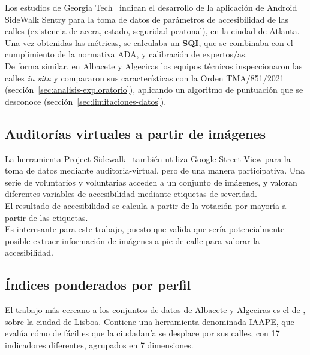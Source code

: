 Los estudios de Georgia Tech~\parencite{frackelton2013, guensler2015} indican el desarrollo de la aplicación de Android SideWalk Sentry para la toma de datos de parámetros de accesibilidad de las calles (existencia de acera, estado, seguridad peatonal), en la ciudad de Atlanta.
\\

Una vez obtenidas las métricas, se calculaba un \textbf{\gls{SQI}}, que se combinaba con el cumplimiento de la normativa ADA, y calibración de expertos/as.
\\

De forma similar, en Albacete y Algeciras los equipos técnicos inspeccionaron las calles \textit{in situ} y compararon sus características con la Orden TMA/851/2021 (sección~\ref{sec:analisis-exploratorio}), aplicando un algoritmo de puntuación que se desconoce (sección~\ref{sec:limitaciones-datos}).
\\

\subsection{Auditorías virtuales a partir de imágenes}
\label{subsec:eval-virtual}

La herramienta Project Sidewalk~\parencite{saha2019} también utiliza Google Street View para la toma de datos mediante \gls{auditoria-virtual}, pero de una manera participativa. Una serie de voluntarios y voluntarias acceden a un conjunto de imágenes, y valoran diferentes variables de accesibilidad mediante etiquetas de severidad.
\\

El resultado de accesibilidad se calcula a partir de la votación por mayoría a partir de las etiquetas.
\\

Es interesante para este trabajo, puesto que valida que sería potencialmente posible extraer información de imágenes a pie de calle para valorar la accesibilidad.
\\

\subsection{Índices ponderados por perfil}
\label{subsec:eval-ponderados}

El trabajo más cercano a los conjuntos de datos de Albacete y Algeciras es el de \textcite{moura2017}, sobre la ciudad de Lisboa. Contiene una herramienta denominada IAAPE, que evalúa cómo de fácil es que la ciudadanía se desplace por sus calles, con 17 indicadores diferentes, agrupados en 7 dimensiones.
\\


